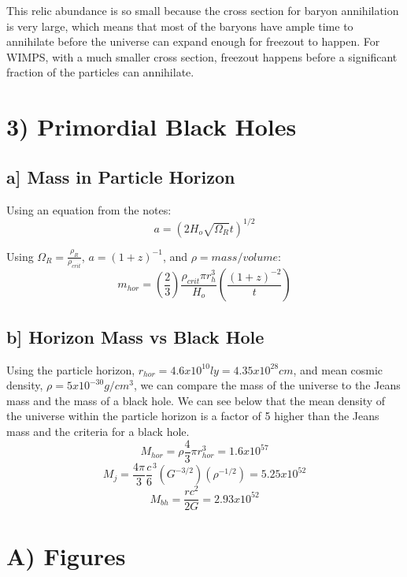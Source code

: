 \documentclass[a4paper,11pt]{article}
\begin{document}
This relic abundance is so small because the cross section for baryon annihilation is very large, which means that most of the baryons have ample time to annihilate before the universe can expand enough for freezout to happen.  For WIMPS, with a much smaller cross section, freezout happens before a significant fraction of the particles can annihilate.

\section*{3) Primordial Black Holes}
\subsection*{a] Mass in Particle Horizon}
Using an equation from the notes:
\begin{equation}
a=(2H_o \sqrt{\Omega_R}t)^{1/2}
\end{equation}

Using $\Omega_R=\frac{\rho_R}{\rho_{crit}}$, $a=(1+z)^{-1}$, and $\rho=mass/volume$:
\begin{equation}
m_{hor}=(\frac{2}{3})\frac{\rho_{crit} \pi r_h^{3}}{H_o}(\frac{(1+z)^{-2}}{t})
\end{equation}


\subsection*{b] Horizon Mass vs Black Hole}
Using the particle horizon, $r_{hor}=4.6x10^{10}ly=4.35x10^{28}cm$, and mean cosmic density, $\rho=5x10^{-30}g/cm^3$, we can compare the mass of the universe to the Jeans mass and the mass of a black hole.  We can see below that the mean density of the universe within the particle horizon is a factor of 5 higher than the Jeans mass and the criteria for a black hole. 
\begin{equation}
M_{hor}=\rho \frac{4}{3}\pi r_{hor}^3=1.6x10^{57}
\end{equation}
\begin{equation}
M_j=\frac{4\pi}{3}\frac{c}{6}^3(G^{-3/2})(\rho^{-1/2})=5.25x10^{52}
\end{equation}
\begin{equation}
M_{bh}=\frac{r c^2}{2G}=2.93x10^{52}
\end{equation}

\section*{A) Figures}
\end{document}
